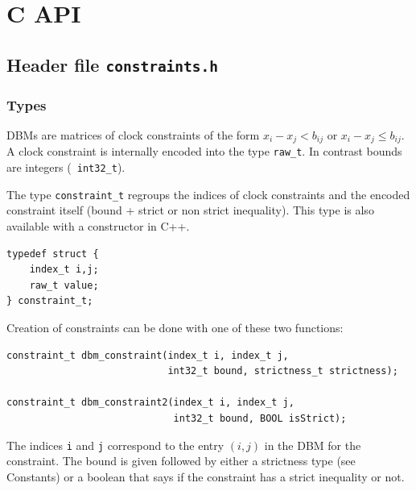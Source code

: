 \documentclass[a4paper]{report}
\begin{document}
\chapter{C API}

\section{Header file {\tt constraints.h}}
\label{SEC:Cconstraints}
\subsection{Types}
DBMs are matrices of clock constraints of the form $x_i-x_j<b_{ij}$ or
$x_i-x_j\le b_{ij}$. A clock constraint is internally encoded into the
type {\tt raw\_t}. In contrast bounds are integers ({\tt
int32\_t}).

The type {\tt constraint\_t} regroups the indices of
clock constraints and the encoded constraint itself (bound + strict or
non strict inequality). This type is also available with a constructor
in C++.
\begin{verbatim}
typedef struct {
    index_t i,j;
    raw_t value;
} constraint_t;
\end{verbatim}
%
Creation of constraints can be done with one of these two functions:
\begin{verbatim}
constraint_t dbm_constraint(index_t i, index_t j,
                            int32_t bound, strictness_t strictness);

constraint_t dbm_constraint2(index_t i, index_t j,
                             int32_t bound, BOOL isStrict);
\end{verbatim}
The indices {\tt i} and {\tt j} correspond to the entry $(i,j)$ in the
DBM for the constraint. The bound is given followed by either a
strictness type (see Constants) or a boolean that says if the
constraint has a strict inequality or not.
\end{document}
